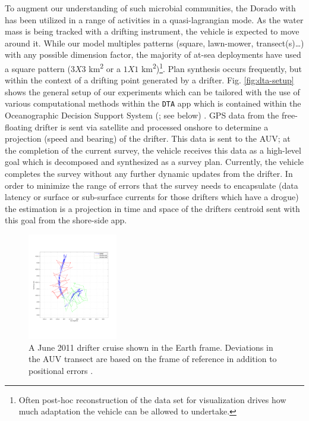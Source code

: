 To augment our understanding of such microbial communities, the Dorado
with \rx has been utilized in a range of activities in a
quasi-lagrangian mode. As the water mass is being tracked with a
drifting instrument, the vehicle is expected to move around it. While
our model  multiples patterns (square, lawn-mower,
transect(s)\dots) with any possible dimension factor, the majority of
at-sea deployments have used a square pattern ($3X3$
km\textsuperscript{2} or a $1X1$ km\textsuperscript{2})\footnote{Often
  post-hoc reconstruction of the data set for visualization drives how
  much adaptation the vehicle can be allowed to undertake.}. Plan
synthesis occurs frequently, but within the context of a drifting
point generated by a drifter. Fig. \ref{fig:dta-setup} shows the
general setup of our experiments which can be tailored with the use of
various computational methods within the \texttt{DTA} app which is
contained within the Oceanographic Decision Support System (\od; see
below) \cite{das11}. GPS data from the free-floating drifter is sent
via satellite and processed onshore to determine a projection (speed
and bearing) of the drifter. This data is sent to the AUV; at the
completion of the current survey, the vehicle receives this data as a
high-level goal which is decomposed and synthesized as a survey
plan. Currently, the vehicle completes the survey without any further
dynamic updates from the drifter. In order to minimize the range of
errors that the survey needs to encapsulate (data latency or surface
or sub-surface currents for those drifters which have a drogue) the
estimation is a projection in time and space of the drifters centroid
sent with this goal from the shore-side app.

\begin{figure}[htpb]
\centering
\includegraphics[width=0.35\textwidth]{figs/june11-drifter-follow-180-181.pdf}
\caption{\small{A June 2011 drifter cruise shown in the Earth
    frame. Deviations in the AUV transect are based on the frame of
    reference in addition to positional errors \cite{das11b}.}}
\label{fig:drifter-errors}
\end{figure}

